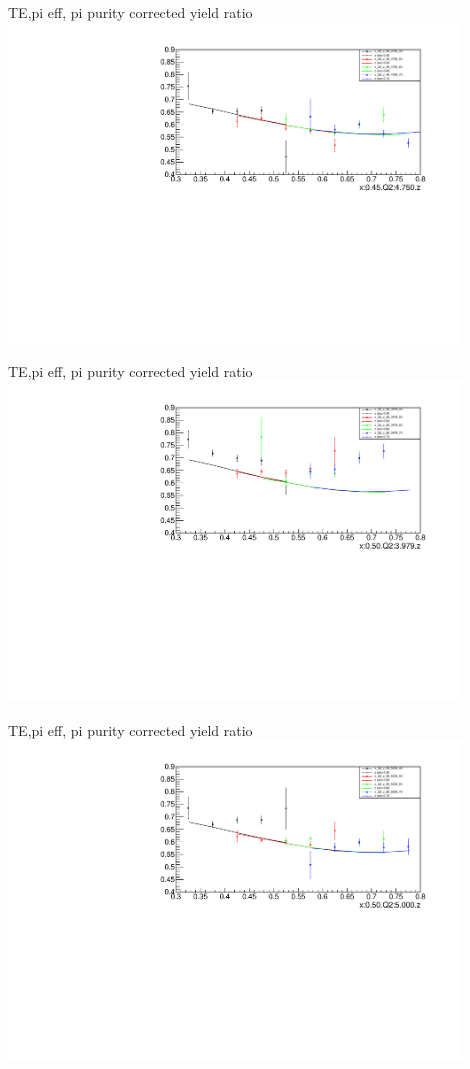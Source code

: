 \begin{frame}{TE,pi eff, pi purity corrected yield ratio}
\includegraphics[width = 0.9\textwidth]{results/yield/statistics_corr/x_Q2_45_4750_ratio.pdf}
\end{frame}
\begin{frame}{TE,pi eff, pi purity corrected yield ratio}
\includegraphics[width = 0.9\textwidth]{results/yield/statistics_corr/x_Q2_50_3979_ratio.pdf}
\end{frame}
\begin{frame}{TE,pi eff, pi purity corrected yield ratio}
\includegraphics[width = 0.9\textwidth]{results/yield/statistics_corr/x_Q2_50_5000_ratio.pdf}
\end{frame}
